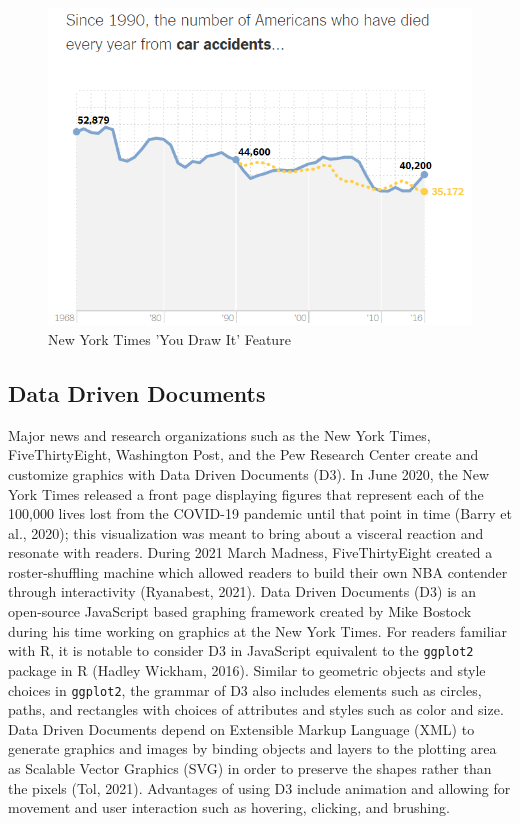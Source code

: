 \documentclass[print]{nuthesis}
\begin{document}
\begin{figure}[tbp]

{\centering \includegraphics[width=0.75\linewidth,]{images/02-you-draw-it/nyt-caraccidents-frame4} 

}

\caption{New York Times 'You Draw It' Feature}\label{fig:nyt-caraccidents}
\end{figure}

\hypertarget{data-driven-documents}{%
\subsection{Data Driven Documents}\label{data-driven-documents}}

Major news and research organizations such as the New York Times, FiveThirtyEight, Washington Post, and the Pew Research Center create and customize graphics with Data Driven Documents (D3).
In June 2020, the New York Times released a front page displaying figures that represent each of the 100,000 lives lost from the COVID-19 pandemic until that point in time (Barry et al., 2020); this visualization was meant to bring about a visceral reaction and resonate with readers.
During 2021 March Madness, FiveThirtyEight created a roster-shuffling machine which allowed readers to build their own NBA contender through interactivity (Ryanabest, 2021).
Data Driven Documents (D3) is an open-source JavaScript based graphing framework created by Mike Bostock during his time working on graphics at the New York Times.
For readers familiar with R, it is notable to consider D3 in JavaScript equivalent to the \texttt{ggplot2} package in R (Hadley Wickham, 2016).
Similar to geometric objects and style choices in \texttt{ggplot2}, the grammar of D3 also includes elements such as circles, paths, and rectangles with choices of attributes and styles such as color and size.
Data Driven Documents depend on Extensible Markup Language (XML) to generate graphics and images by binding objects and layers to the plotting area as Scalable Vector Graphics (SVG) in order to preserve the shapes rather than the pixels  (Tol, 2021).
Advantages of using D3 include animation and allowing for movement and user interaction such as hovering, clicking, and brushing.
\end{document}
